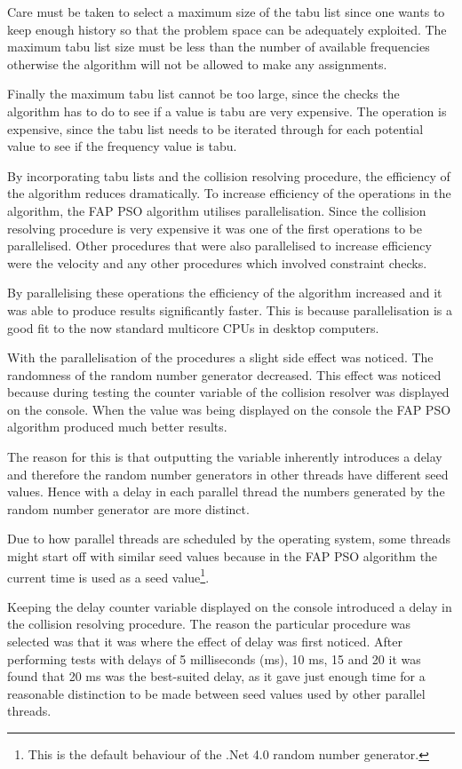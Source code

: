 Care must be taken to select a maximum size of the tabu list since one wants to keep enough history so that the problem space can be adequately exploited. The maximum tabu list size must be less than the number of available frequencies otherwise the algorithm will not be allowed to make any assignments. 

Finally the maximum tabu list cannot be too large, since the checks the algorithm has to do to see if a value is tabu are very expensive. The operation is expensive, since the tabu list needs to be iterated through for each potential value to see if the frequency value is tabu.

By incorporating tabu lists and the collision resolving procedure, the efficiency of the algorithm reduces dramatically. To increase efficiency of the operations in the algorithm, the \gls{FAP} \gls{PSO} algorithm utilises parallelisation. Since the collision resolving procedure is very expensive it was one of the first operations to be parallelised. Other procedures that were also parallelised to increase efficiency were the velocity and any other procedures which involved constraint checks.

By parallelising these operations the efficiency of the algorithm increased and it was able to produce results significantly faster. This is because parallelisation is a good fit to the now standard multicore CPUs in desktop computers.

With the parallelisation of the procedures a slight side effect was noticed. The randomness of the random number generator decreased. This effect was noticed because during testing the counter variable of the collision resolver was displayed on the console. When the value was being displayed on the console the \gls{FAP} \gls{PSO} algorithm produced much better results. 

The reason for this is that outputting the variable inherently introduces a delay and therefore the random number generators in other threads have different seed values. Hence with a delay in each parallel thread the numbers generated by the random number generator are more distinct. 

Due to how parallel threads are scheduled by the operating system, some threads might start off with similar seed values because in  the \gls{FAP} \gls{PSO} algorithm the current time is used as a seed value\footnote{This is the default behaviour of the .Net 4.0 random number generator.}.

Keeping the delay counter variable displayed on the console introduced a delay in the collision resolving procedure. The reason the particular procedure was selected was that it was where the effect of delay was first noticed. After performing tests with delays of 5 milliseconds (ms), 10 ms, 15 and 20 it was found that 20 ms was the best-suited delay, as it gave just enough time for a reasonable distinction to be made between seed values used by other parallel threads.

